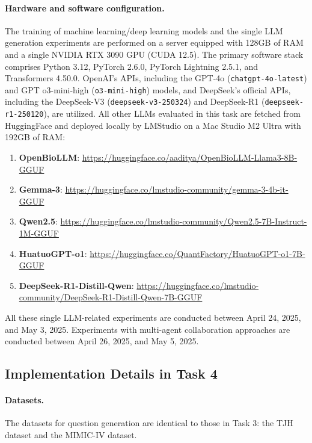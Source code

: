 \documentclass{article}
\begin{document}
\paragraph{Hardware and software configuration.}
\label{sec:app_task3_hardware_software}
The training of machine learning/deep learning models and the single LLM generation experiments are performed on a server equipped with 128GB of RAM and a single NVIDIA RTX 3090 GPU (CUDA 12.5). The primary software stack comprises Python 3.12, PyTorch 2.6.0, PyTorch Lightning 2.5.1, and Transformers 4.50.0. OpenAI's APIs, including the GPT-4o (\texttt{chatgpt-4o-latest}) and GPT o3-mini-high (\texttt{o3-mini-high}) models, and DeepSeek's official APIs, including the DeepSeek-V3 (\texttt{deepseek-v3-250324}) and DeepSeek-R1 (\texttt{deepseek-r1-250120}), are utilized. All other LLMs evaluated in this task are fetched from HuggingFace and deployed locally by LMStudio on a Mac Studio M2 Ultra with 192GB of RAM:
\begin{enumerate}
    \item \textbf{OpenBioLLM}: \url{https://huggingface.co/aaditya/OpenBioLLM-Llama3-8B-GGUF}
    \item \textbf{Gemma-3}: \url{https://huggingface.co/lmstudio-community/gemma-3-4b-it-GGUF}
    \item \textbf{Qwen2.5}: \newline \url{https://huggingface.co/lmstudio-community/Qwen2.5-7B-Instruct-1M-GGUF}
    \item \textbf{HuatuoGPT-o1}: \url{https://huggingface.co/QuantFactory/HuatuoGPT-o1-7B-GGUF}
    \item \textbf{DeepSeek-R1-Distill-Qwen}: \url{https://huggingface.co/lmstudio-community/DeepSeek-R1-Distill-Qwen-7B-GGUF}
\end{enumerate}

All these single LLM-related experiments are conducted between April 24, 2025, and May 3, 2025. Experiments with multi-agent collaboration approaches are conducted between April 26, 2025, and May 5, 2025.

\subsection{Implementation Details in Task 4}
\label{sec:app_task4_details}

\paragraph{Datasets.}
\label{sec:app_task4_datasets}
The datasets for question generation are identical to those in Task 3: the TJH dataset and the MIMIC-IV dataset.
\end{document}
